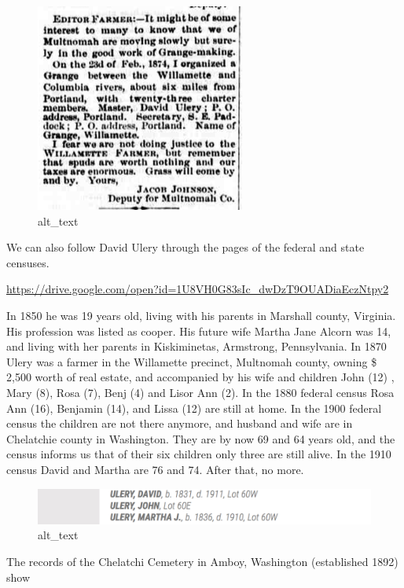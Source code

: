 \documentclass[
  12pt,
]{book}
\begin{document}
\begin{figure}
\centering
\includegraphics{images/0202b_images/image2.png}
\caption{alt\_text}
\end{figure}

We can also follow David Ulery through the pages of the federal and state censuses.

\url{https://drive.google.com/open?id=1U8VH0G83sIc_dwDzT9OUADiaEczNtpy2}

In 1850 he was 19 years old, living with his parents in Marshall county, Virginia. His profession was listed as cooper. His future wife Martha Jane Alcorn was 14, and living with her parents in Kiskiminetas, Armstrong, Pennsylvania. In 1870 Ulery was a farmer in the Willamette precinct, Multnomah county, owning \$ 2,500 worth of real estate, and accompanied by his wife and children John (12) , Mary (8), Rosa (7), Benj (4) and Lisor Ann (2). In the 1880 federal census Rosa Ann (16), Benjamin (14), and Lissa (12) are still at home. In the 1900 federal census the children are not there anymore, and husband and wife are in Chelatchie county in Washington. They are by now 69 and 64 years old, and the census informs us that of their six children only three are still alive. In the 1910 census David and Martha are 76 and 74. After that, no more.

\begin{figure}
\centering
\includegraphics{images/0202b_images/image3.png}
\caption{alt\_text}
\end{figure}

The records of the Chelatchi Cemetery in Amboy, Washington (established 1892) show
\end{document}
